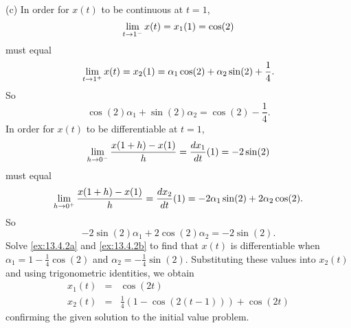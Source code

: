 \documentclass{ximera}
\begin{document}
\begin{exercise}
\begin{solution}
(c) In order for $x(t)$ to be continuous at $t = 1$,
\[
\displaystyle\lim_{t \rightarrow 1^{-}} x(t) = x_1(1) = \cos(2)
\]
must equal
\[
\displaystyle\lim_{t \rightarrow 1^{+}} x(t) = x_2(1) =
\alpha_1\cos(2) + \alpha_2\sin(2) + \frac{1}{4}.
\]
So
\begin{equation} \label{ex:13.4.2a}
\cos(2)\alpha_1 + \sin(2)\alpha_2 = \cos(2) - \frac{1}{4}.
\end{equation}
In order for $x(t)$ to be differentiable at $t = 1$,
\[
\displaystyle\lim_{h \rightarrow 0^{-}} \frac{x(1 + h) - x(1)}{h} =
\frac{dx_1}{dt}(1) = -2\sin(2)
\]
must equal
\[
\displaystyle\lim_{h \rightarrow 0^{+}} \frac{x(1 + h) - x(1)}{h} =
\frac{dx_2}{dt}(1) = -2\alpha_1\sin(2) + 2\alpha_2\cos(2).
\]
So
\begin{equation} \label{ex:13.4.2b}
-2\sin(2)\alpha_1 + 2\cos(2)\alpha_2 = -2\sin(2).
\end{equation}
Solve \eqref{ex:13.4.2a} and \eqref{ex:13.4.2b} to find that $x(t)$ is
differentiable when $\alpha_1 = 1 - \frac{1}{4}\cos(2)$ and $\alpha_2
= -\frac{1}{4}\sin(2)$.  Substituting these values into $x_2(t)$ and
using trigonometric identities, we obtain
\[
\begin{array}{rcl}
x_1(t) & = & \cos(2t) \\
x_2(t) & = & \frac{1}{4}(1 - \cos(2(t - 1))) + \cos(2t)
\end{array}
\]
confirming the given solution to the initial value problem.











\end{solution}
\end{exercise}
\end{document}
